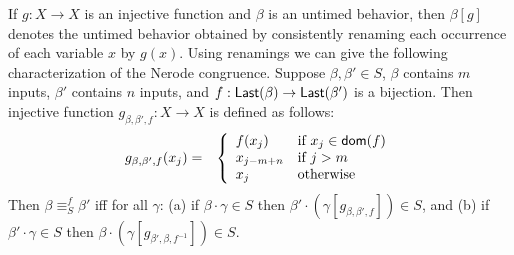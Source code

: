 If $g : X \to X$ is an injective function and $\beta$ is an untimed behavior, then $\beta [g]$ denotes the untimed behavior obtained
by consistently renaming each occurrence of each variable $x$ by $g(x)$. Using renamings we can give the following characterization
of the Nerode congruence.
Suppose $\beta, \beta' \in S$, $\beta$ contains $m$ inputs, $\beta'$ contains $n$ inputs,
and $f : \mathsf{Last}({\beta})  \to \mathsf{Last}({\beta'})$ is a bijection. 
Then injective function $g_{\beta, \beta', f}: X \to X$ is defined as follows:
\begin{eqnarray*}
g_{\beta, \beta', f} (x_j) & = & \left\{ 
\begin{array}{ll}
f(x_j) & \mbox{if } x_j \in {\textsf{dom}}(f)\\
x_{j-m+n} & \mbox{if } j > m \\
x_j    & \mbox{otherwise }
\end{array}
\right.
\end{eqnarray*}
Then $\beta \equiv^f_S \beta'$ iff for all $\gamma$:
(a) if $\beta \cdot \gamma \in S$ then $\beta' \cdot (\gamma[g_{\beta, \beta', f}]) \in S$, and
(b) if $\beta' \cdot \gamma \in S$ then $\beta \cdot (\gamma[g_{\beta', \beta, f^{-1}}]) \in S$.

